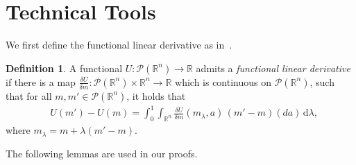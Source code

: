 \documentclass{article}
\theoremstyle{plain}
\theoremstyle{plain}
\theoremstyle{definition}
\newtheorem{definition}[theorem]{Definition}
\theoremstyle{remark}
\newcommand{\mrd}{\mathrm{d}}
\begin{document}



\section{Technical Tools}
\label{app:technical}
We first define the functional linear derivative as in~\cite{cardaliaguet2019master}. 
\begin{definition}{\citep{cardaliaguet2019master}}
\label{def:flatDerivative}
A functional $U:\mathcal P(\mathbb R^n) \to \mathbb R$ 
admits a {\it functional linear derivative}
if there is a map $\frac{\delta U}{\delta m} : \mathcal P(\mathbb R^n) \times \mathbb R^n \to \mathbb R$ which is continuous on $\mathcal P(\mathbb R^n)$, such that for all
$m, m' \in\mathcal P(\mathbb R^n)$, it holds that
\begin{align*}
&U(m') - U(m) =\!\int_0^1 \int_{\mathbb{R}^n} \frac{\delta U}{\delta m}(m_\lambda,a) \, (m'
-m)(da)\,\mrd \lambda,
\end{align*}
where $m_\lambda=m + \lambda(m' - m)$.
\end{definition}   

The following lemmas are used in our proofs.
\end{document}
